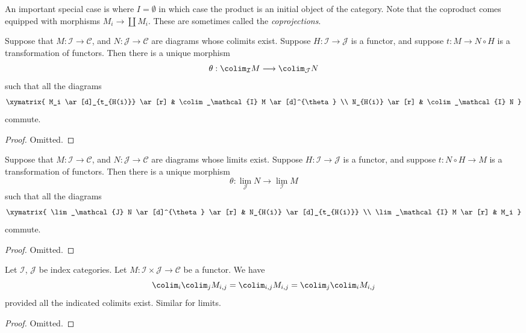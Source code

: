 \noindent
An important special case is where $I = \emptyset$ in which case the
product is an initial object of the category.
Note that the coproduct comes equipped with morphisms
$M_i \to \coprod M_i$. These are sometimes called the
{\it coprojections}.

\begin{lemma}
\label{lemma-functorial-colimit}
Suppose that $M : \mathcal{I} \to \mathcal{C}$,
and $N : \mathcal{J} \to \mathcal{C}$ are diagrams
whose colimits exist. Suppose
$H : \mathcal{I} \to \mathcal{J}$ is
a functor, and suppose $t : M \to N \circ H$
is a transformation of functors.
Then there is a unique morphism
$$
\theta :
\colim_\mathcal{I} M
\longrightarrow
\colim_\mathcal{J} N
$$
such that all the diagrams
$$
\xymatrix{
M_i \ar[d]_{t_{H(i)}} \ar[r]
&
\colim_\mathcal{I} M \ar[d]^{\theta}
\\
N_{H(i)} \ar[r]
&
\colim_\mathcal{I} N
}
$$
commute.
\end{lemma}

\begin{proof}
Omitted.
\end{proof}

\begin{lemma}
\label{lemma-functorial-limit}
Suppose that $M : \mathcal{I} \to \mathcal{C}$,
and $N : \mathcal{J} \to \mathcal{C}$ are diagrams
whose limits exist. Suppose $H : \mathcal{I} \to \mathcal{J}$ is
a functor, and suppose $t : N \circ H \to M$
is a transformation of functors.
Then there is a unique morphism
$$
\theta :
\lim_\mathcal{J} N
\longrightarrow
\lim_\mathcal{I} M
$$
such that all the diagrams
$$
\xymatrix{
\lim_\mathcal{J} N \ar[d]^{\theta} \ar[r]
&
N_{H(i)} \ar[d]_{t_{H(i)}}
\\
\lim_\mathcal{I} M \ar[r]
&
M_i
}
$$
commute.
\end{lemma}

\begin{proof}
Omitted.
\end{proof}


\begin{lemma}
\label{lemma-colimits-commute}
Let $\mathcal{I}$, $\mathcal{J}$ be index categories.
Let $M : \mathcal{I} \times \mathcal{J} \to \mathcal{C}$ be a functor.
We have
$$
\colim_i \colim_j M_{i, j}
=
\colim_{i, j} M_{i, j}
=
\colim_j \colim_i M_{i, j}
$$
provided all the indicated colimits exist. Similar for limits.
\end{lemma}

\begin{proof}
Omitted.
\end{proof}

